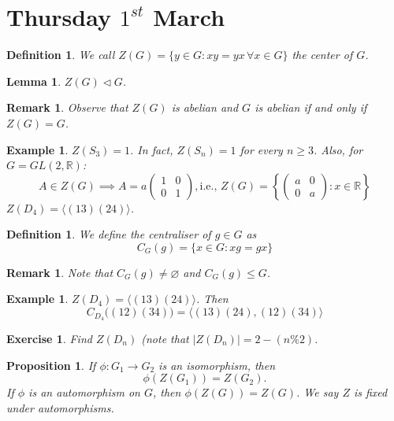 \documentclass[a4paper,10pt]{article}
\newcommand{\RR}{\mathbb{R}}
\newtheorem{Def}[thm]{Definition}
\newtheorem{prop}[thm]{Proposition}
\newtheorem{eg}[thm]{Example}
\newtheorem{Ex}[thm]{Exercise}
\newtheorem{Lem}[thm]{Lemma}
\newtheorem{rem}[thm]{Remark}
\begin{document}
\section{Thursday $1^{st}$ March}
\begin{Def}
We call $Z(G) = \{ y \in G : xy = yx \, \forall x \in G \}$ the center of $G$.
\end{Def}
\begin{Lem}
$Z(G) \triangleleft G$.
\end{Lem}
\begin{rem}
Observe that $Z(G)$ is abelian and $G$ is abelian if and only if $Z(G) = G$.
\end{rem}
\begin{eg}
$Z(S_3) = 1$. In fact, $Z(S_n) = 1$ for every $n \geq 3$. Also, for $G = GL(2, \RR)$:
\[ A \in Z(G) \implies A = a \begin{pmatrix} 1 & 0 \\ 0 & 1 \end{pmatrix}, \text{i.e., } Z(G) = \left\{ \begin{pmatrix} a & 0 \\ 0 & a \end{pmatrix} : x \in \RR \right\}  \]
$Z(D_4) = \langle (13)(24) \rangle$. 
\end{eg}
\begin{Def}
We define the centraliser of $g \in G$ as 
\[ C_G(g) = \{ x \in G : xg = gx \} \]
\end{Def}
\begin{rem}
Note that $C_G(g) \neq \varnothing$ and $C_G(g) \leq G$. 
\end{rem}
\begin{eg}
$Z(D_4) = \langle (13)(24) \rangle$. Then
\[ C_{D_4} \big( (12)(34) \big) = \langle (13)(24), (12)(34) \rangle \]
\end{eg}
\begin{Ex}
Find $Z(D_n)$ (note that $|Z(D_n)| = 2 - (n \% 2)$.
\end{Ex}
\begin{prop}
If $\phi: G_1 \rightarrow G_2$ is an isomorphism, then
\[ \phi(Z(G_1)) = Z(G_2). \]
If $\phi$ is an automorphism on $G$, then $\phi(Z(G)) = Z(G)$. We say $Z$ is fixed under automorphisms. 
\end{prop}
\end{document}
